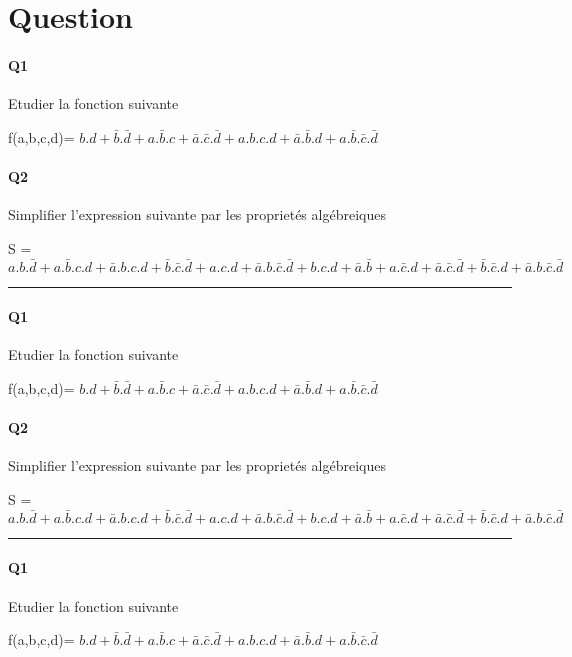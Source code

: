 
\section{Question}

\paragraph{Q1}

Etudier la fonction suivante

f(a,b,c,d)= $b.d+\bar b.\bar d+a.\bar b.c+\bar a.\bar c.\bar d + a.b.c.d+\bar a.\bar b.d+a.\bar b.\bar c.\bar d$

\paragraph{Q2}

Simplifier l'expression suivante par les proprietés algébreiques 

S = $a.b.\bar d+a.\bar b.c.d+\bar a.b.c.d+\bar b.\bar c.\bar d + a.c.d+\bar a.b.\bar c.\bar d + b.c.d+\bar a.\bar b+a.\bar c.d+\bar a.\bar c.\bar d + \bar b.\bar c.d+\bar a.b.\bar c.\bar d$

\hrule width 1\linewidth
\paragraph{Q1}

Etudier la fonction suivante

f(a,b,c,d)= $b.d+\bar b.\bar d+a.\bar b.c+\bar a.\bar c.\bar d + a.b.c.d+\bar a.\bar b.d+a.\bar b.\bar c.\bar d$

\paragraph{Q2}

Simplifier l'expression suivante par les proprietés algébreiques 

S = $a.b.\bar d+a.\bar b.c.d+\bar a.b.c.d+\bar b.\bar c.\bar d + a.c.d+\bar a.b.\bar c.\bar d + b.c.d+\bar a.\bar b+a.\bar c.d+\bar a.\bar c.\bar d + \bar b.\bar c.d+\bar a.b.\bar c.\bar d$

\hrule width 1\linewidth
\paragraph{Q1}

Etudier la fonction suivante

f(a,b,c,d)= $b.d+\bar b.\bar d+a.\bar b.c+\bar a.\bar c.\bar d + a.b.c.d+\bar a.\bar b.d+a.\bar b.\bar c.\bar d$

